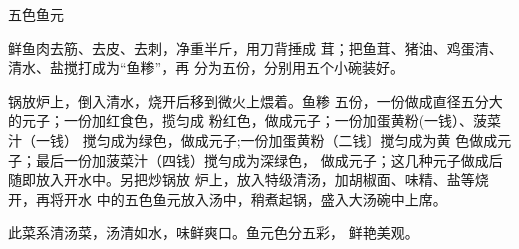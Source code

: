 \begin{recipe}[五福鱼元]{五色鱼元}

\ingredients


\cooking

\step 	鲜鱼肉去筋、去皮、去刺，净重半斤，用刀背捶成 茸；把鱼茸、猪油、鸡蛋清、清水、盐搅打成为“鱼糁”，再 分为五份，分别用五个小碗装好。

\step 	锅放炉上，倒入清水，烧开后移到微火上煨着。鱼糁 五份，一份做成直径五分大的元子；一份加红食色，揽匀成 粉红色，做成元子；一份加蛋黄粉(一钱）、菠菜汁（一钱） 搅匀成为绿色，做成元子;一份加蛋黄粉（二钱〕搅匀成为黄 色做成元子；最后一份加菠菜汁（四钱）搅勻成为深绿色， 做成元子；这几种元子做成后随即放入开水中。另把炒锅放 炉上，放入特级清汤，加胡椒面、味精、盐等烧开，再将开水 中的五色鱼元放入汤中，稍煮起锅，盛入大汤碗中上席。

\notes

此菜系清汤菜，汤清如水，味鲜爽口。鱼元色分五彩， 鲜艳美观。

\end{recipe}

